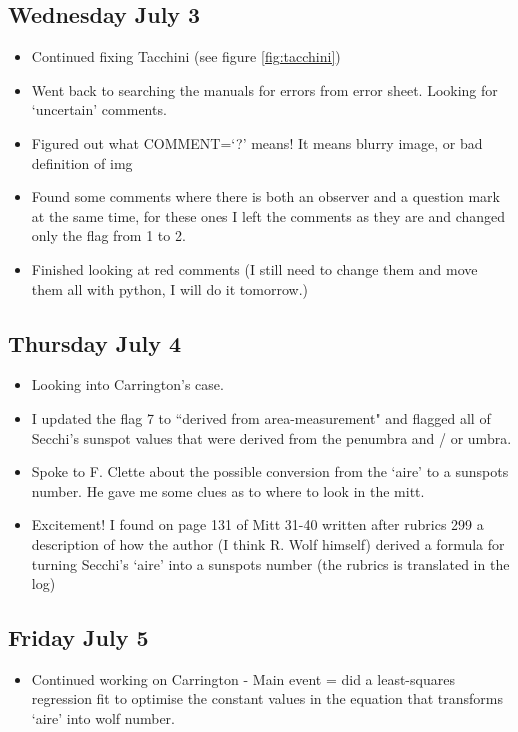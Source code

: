 \documentclass[12pt]{article}
\begin{document}
\subsection{Wednesday July 3}\label{what is flag 2 question mark}
\begin{itemize}
    \item Continued fixing Tacchini (see figure \ref{fig:tacchini})
    \item Went back to searching the manuals for errors from error sheet. Looking for `uncertain' comments.
    \item Figured out what COMMENT=`?' means! It means blurry image, or bad definition of img
    \item Found some comments where there is both an observer and a question mark at the same time, for these ones I left the comments as they are and changed only the flag from 1 to 2.
    \item Finished looking at red comments (I still need to change them and move them all with python, I will do it tomorrow.)
    \end{itemize}
            
\subsection{Thursday July 4}
\begin{itemize}
    \item Looking into Carrington's case.
    \item I updated the flag 7 to ``derived from area-measurement" and flagged all of Secchi's sunspot values that were derived from the penumbra and / or umbra.
    \item Spoke to F. Clette about the possible conversion from the `aire' to a sunspots number. He gave me some clues as to where to look in the mitt.
    \item Excitement! I found on page 131 of Mitt 31-40 written after rubrics 299 a description of how the author (I think R. Wolf himself) derived a formula for turning Secchi's `aire' into a sunspots number (the rubrics is translated in the log)
\end{itemize}
        
\subsection{Friday July 5}
\begin{itemize}
    \item Continued working on Carrington - Main event = did a least-squares regression fit to optimise the constant values in the equation that transforms `aire' into wolf number.
\end{itemize}
\end{document}
